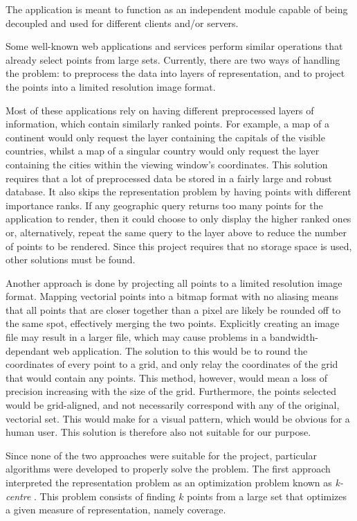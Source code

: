 

The application is meant to function as an independent module capable of being decoupled and used for different clients and/or servers.

Some well-known web applications and services perform similar operations that already select points from large sets. Currently, there are two ways of handling the problem: to preprocess the data into layers of representation, and to project the points into a limited resolution image format.

Most of these applications rely on having different preprocessed layers of information, which contain similarly ranked points. For example, a map of a continent would only request the layer containing the capitals of the visible countries, whilst a map of a singular country would only request the layer containing the cities within the viewing window's coordinates. This solution requires that a lot of preprocessed data be stored in a fairly large and robust database. It also skips the representation problem by having points with different importance ranks. If any geographic query returns too many points for the application to render, then it could choose to only display the higher ranked ones or, alternatively, repeat the same query to the layer above to reduce the number of points to be rendered. Since this project requires that no storage space is used, other solutions must be found.

Another approach is done by projecting all points to a limited resolution image format. Mapping vectorial points into a bitmap format with no aliasing means that all points that are closer together than a pixel are likely be rounded off to the same spot, effectively merging the two points. Explicitly creating an image file may result in a larger file, which may cause problems in a bandwidth-dependant web application. The solution to this would be to round the coordinates of every point to a grid, and only relay the coordinates of the grid that would contain any points. This method, however, would mean a loss of precision increasing with the size of the grid. Furthermore, the points selected would be grid-aligned, and not necessarily correspond with any of the original, vectorial set. This would make for a visual pattern, which would be obvious for a human user. This solution is therefore also not suitable for our purpose.

Since none of the two approaches were suitable for the project, particular algorithms were developed to properly solve the problem. The first approach interpreted the representation problem as an optimization problem known as \emph{k-centre} \cite{facilityloc}. This problem consists of finding $k$ points from a large set that optimizes a given measure of representation, namely coverage.  


